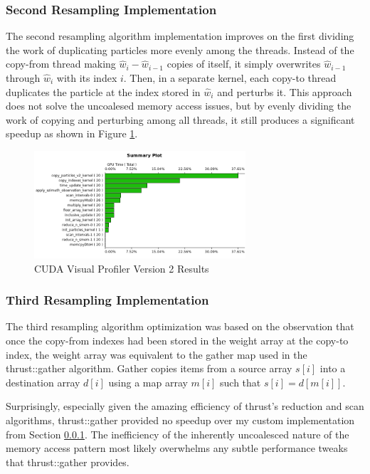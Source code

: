 \documentclass{article}
\begin{document}
\subsubsection{Second Resampling Implementation}\label{resamplesection2}

The second resampling algorithm implementation improves on the first dividing the work of duplicating particles more evenly among the threads. Instead of the copy-from thread making \(\hat{w}_{i}-\hat{w}_{i-1}\) copies of itself, it simply overwrites \(\hat{w}_{i-1}\) through \(\hat{w}_{i}\) with its index \(i\). Then, in a separate kernel, each copy-to thread duplicates the particle at the index stored in \(\hat{w}_{i}\) and perturbs it. This approach does not solve the uncoalesed memory access issues, but by evenly dividing the work of copying and perturbing among all threads, it still produces a significant speedup as shown in Figure \ref{profiler2}.

\begin{figure}
\centering
\includegraphics[width=0.7\textwidth]{data/profile_cuda_version2_pic1.png}
\caption{CUDA Visual Profiler Version 2 Results}
\label{profiler2}
\end{figure}

\subsubsection{Third Resampling Implementation}
The third resampling algorithm optimization was based on the observation that once the copy-from indexes had been stored in the weight array at the copy-to index, the weight array was equivalent to the gather map used in the thrust::gather algorithm. Gather copies items from a source array \(s[i]\) into a destination array \(d[i]\) using a map array \(m[i]\) such that \(s[i]=d[m[i]]\).\cite{thrust}

Surprisingly, especially given the amazing efficiency of thrust's reduction and scan algorithms, thrust::gather provided no speedup over my custom implementation from Section \ref{resamplesection2}. The inefficiency of the inherently uncoalesced nature of the memory access pattern most likely overwhelms any subtle performance tweaks that thrust::gather provides.
\end{document}
